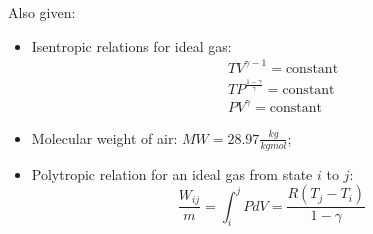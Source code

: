 \documentclass[calculator,datasheet,sample]{exam}
\newcommand{\frc}{\displaystyle\frac}
\begin{document}
\begin{question}
\begin{enumerate}
{}
%
\end{enumerate} 
Also given:
\begin{itemize}
\item Isentropic relations for ideal gas:
\begin{eqnarray}
&& TV^{\gamma-1}=\text{constant} \nonumber \\
&& TP^{\frac{1-\gamma}{\gamma}}=\text{constant} \nonumber \\
&& PV^{\gamma}=\text{constant} \nonumber 
\end{eqnarray}
\item Molecular weight of air:  $MW=28.97\frc{kg}{kgmol}$;
\item Polytropic relation for an ideal gas from state $i$ to $j$:
\begin{displaymath}
\frc{W_{ij}}{m} = \int_{i}^{j}P dV = \frc{R\left(T_{j}-T_{i}\right)}{1-\gamma}
\end{displaymath}
\end{itemize}
\end{question}


\clearpage
\end{document}
